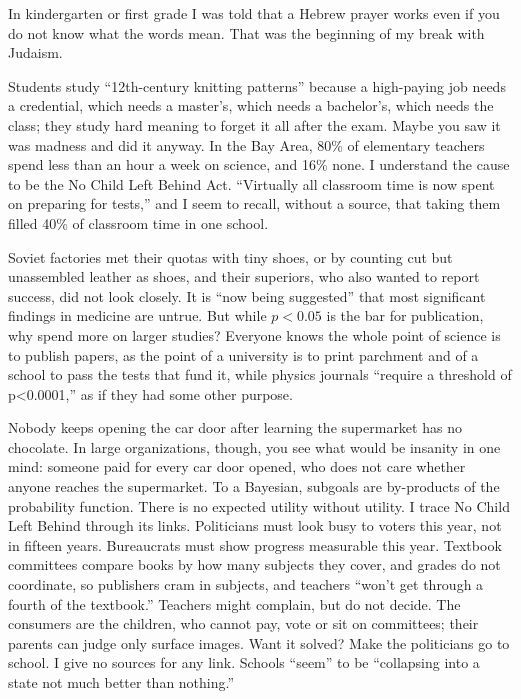 
In kindergarten or first grade I was told that a Hebrew prayer works even if you do not know what the words mean. That was the beginning of my break with Judaism.

Students study ``12th-century knitting patterns'' because a high-paying job needs a credential, which needs a master's, which needs a bachelor's, which needs the class; they study hard meaning to forget it all after the exam. Maybe you saw it was madness and did it anyway. In the Bay Area, 80\% of elementary teachers spend less than an hour a week on science, and 16\% none. I understand the cause to be the No Child Left Behind Act. ``Virtually all classroom time is now spent on preparing for tests,'' and I seem to recall, without a source, that taking them filled 40\% of classroom time in one school. 

Soviet factories met their quotas with tiny shoes, or by counting cut but unassembled leather as shoes, and their superiors, who also wanted to report success, did not look closely. It is ``now being suggested'' that most significant findings in medicine are untrue. But while $p<0.05$ is the bar for publication, why spend more on larger studies? Everyone knows the whole point of science is to publish papers, as the point of a university is to print parchment and of a school to pass the tests that fund it, while physics journals ``require a threshold of p<0.0001,'' as if they had some other purpose. 

Nobody keeps opening the car door after learning the supermarket has no chocolate. In large organizations, though, you see what would be insanity in one mind: someone paid for every car door opened, who does not care whether anyone reaches the supermarket. To a Bayesian, subgoals are by-products of the probability function. There is no expected utility without utility. I trace No Child Left Behind through its links. Politicians must look busy to voters this year, not in fifteen years. Bureaucrats must show progress measurable this year. Textbook committees compare books by how many subjects they cover, and grades do not coordinate, so publishers cram in subjects, and teachers ``won't get through a fourth of the textbook.'' Teachers might complain, but do not decide. The consumers are the children, who cannot pay, vote or sit on committees; their parents can judge only surface images. Want it solved? Make the politicians go to school. I give no sources for any link. Schools ``seem'' to be ``collapsing into a state not much better than nothing.'' 

